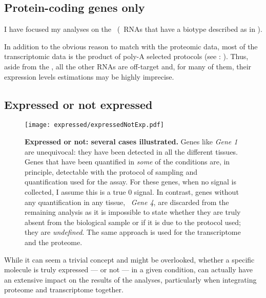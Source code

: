 \subsection{Protein-coding genes only}\label{subsec:protcodingOnly}
\vspace{-0.3in}
I have focused my analyses on the \mRNAs\ (\ie\ \glspl{RNA} that have a
biotype described as \emph{\pc} in ).

In addition to the obvious reason to match with the proteomic data,
most of the transcriptomic data is the product of poly-A selected protocols
(see : ).
Thus, aside from the \mRNAs, all the other \glspl{RNA} are off-target
and, for many of them,
their expression levels estimations may be highly imprecise.

\vspace{-0.1in}
\subsection{Expressed or not expressed}\label{sec:ExpressedOrNot}
\vspace{-0.3in}
\begin{figure}[!htb]
    \texttt{[image: expressed/expressedNotExp.pdf]}\centering
      \caption[Expressed or not: several cases illustrated]
      {\label{fig:DefineExpression}\textbf{Expressed or not: several cases
      illustrated.}\smallbreak{} Genes like \emph{Gene 1} are unequivocal: they have been
      detected in all the different tissues. Genes that have been quantified in
      \emph{some} of the conditions are, in principle, detectable with the
      protocol of sampling and quantification used for the assay.
      For these genes, when no signal is collected, I assume this is a true $0$ signal.
      In contrast, genes without any quantification
      in any tissue, \eg\ \emph{Gene 4}, are discarded from the remaining analysis as
      it is impossible to state
      whether they are truly absent from the biological sample or if it is due
      to the protocol used; they are \emph{undefined}. The same approach is used
      for the transcriptome and the proteome.}
\end{figure}

While it can seem a trivial concept and might be overlooked, whether a specific
molecule is truly expressed --- or not --- in a given condition, can actually have
an extensive impact on the results of the analyses, particularly when integrating
proteome and transcriptome together.


